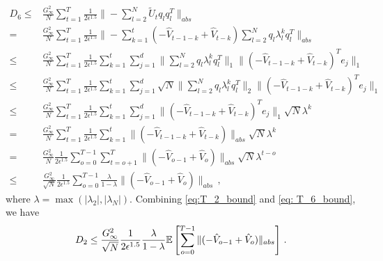 \documentclass[11pt]{article}
\begin{document}
\begin{align}\label{eq: T_6_bound}
D_6 \leq & \frac{G_{\infty}^2}{N}\sum_{t=1}^T \frac{1}{2\epsilon^{1.5}}  \| - \sum_{l=2}^N  \tilde U_t q_l q_l^T \|_{abs} \nonumber \\
=  & \frac{G_{\infty}^2}{N}\sum_{t=1}^T \frac{1}{2\epsilon^{1.5}}  \| -   \sum_{k=1}^t (- \hat V_{t-1-k} + \hat V_{t-k} )  \sum_{l=2}^N q_l \lambda_l^k q_l^T \|_{abs} \nonumber  \\ 
\leq &  \frac{G_{\infty}^2}{N}\sum_{t=1}^T \frac{1}{2\epsilon^{1.5}}  \sum_{k=1}^t  \sum_{j=1}^d \| \sum_{l=2}^N q_l \lambda_l^k q_l^T \|_{1}  \|     (- \hat V_{t-1-k} + \hat V_{t-k} )^T e_j \|_1  \nonumber \\
\leq &  \frac{G_{\infty}^2}{N}\sum_{t=1}^T \frac{1}{2\epsilon^{1.5}}  \sum_{k=1}^t  \sum_{j=1}^d  \sqrt{N}\| \sum_{l=2}^N q_l \lambda_l^k q_l^T \|_{2}  \|     (- \hat V_{t-1-k} + \hat V_{t-k} )^T e_j \|_1  \nonumber \\
\leq  & \frac{G_{\infty}^2}{N}\sum_{t=1}^T \frac{1}{2\epsilon^{1.5}}  \sum_{k=1}^t \sum_{j=1}^d \|    (- \hat V_{t-1-k} + \hat V_{t-k} )^T e_j\|_1 \sqrt{N} \lambda^k \nonumber  \\
=  & \frac{G_{\infty}^2}{N}\sum_{t=1}^T \frac{1}{2\epsilon^{1.5}}  \sum_{k=1}^t  \|    (- \hat V_{t-1-k} + \hat V_{t-k} ) \|_{abs} \sqrt{N} \lambda^k \nonumber \\
=  & \frac{G_{\infty}^2}{N}\frac{1}{2\epsilon^{1.5}} \sum_{o=0}^{T-1} \sum_{t=o+1}^T     \|    (- \hat V_{o-1} + \hat V_{o} ) \|_{abs} \sqrt{N} \lambda^{t-o} \nonumber  \\ 
\leq & \frac{G_{\infty}^2}{\sqrt{N}}\frac{1}{2\epsilon^{1.5}} \sum_{o=0}^{T-1} \frac{\lambda}{1-\lambda}     \|    (- \hat V_{o-1} + \hat V_{o} ) \|_{abs} \, ,
\end{align}
where $\lambda = \max (|\lambda_2|,|\lambda_N|)$.
Combining \eqref{eq:T_2_bound} and \eqref{eq: T_6_bound}, we have
\begin{equation}\notag
D_2 \leq  \frac{G_{\infty}^2}{\sqrt{N}}\frac{1}{2\epsilon^{1.5}} \frac{\lambda}{1-\lambda}   \mathbb E \left[ \sum_{o=0}^{T-1}     \|    (- \hat V_{o-1} + \hat V_{o} ) \|_{abs} \right]  \, .
\end{equation}
\end{document}
